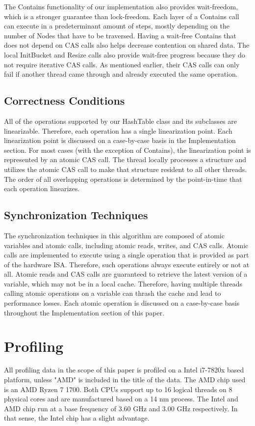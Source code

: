 \documentclass[11pt]{article} %
\begin{document}
The Contains functionality of our implementation also provides wait-freedom, which is a stronger guarantee than lock-freedom. Each layer of a Contains call can execute in a predeterminant amount of steps, mostly depending on the number of Nodes that have to be traversed. Having a wait-free Contains that does not depend on CAS calls also helps decrease contention on shared data. The local InitBucket and Resize calls also provide wait-free progress because they do not require iterative CAS calls. As mentioned earlier, their CAS calls can only fail if another thread came through and already executed the same operation.

\subsection{Correctness Conditions}

All of the operations supported by our HashTable class and its subclasses are linearizable. Therefore, each operation has a single linearization point. Each linearization point is discussed on a case-by-case basis in the Implementation section. For most cases (with the exception of Contains), the linearization point is represented by an atomic CAS call. The thread locally processes a structure and utilizes the atomic CAS call to make that structure resident to all other threads. The order of all overlapping operations is determined by the point-in-time that each operation linearizes. 

\subsection{Synchronization Techniques}

The synchronization techniques in this algorithm are composed of atomic variables and atomic calls, including atomic reads, writes, and CAS calls. Atomic calls are implemented to execute using a single operation that is provided as part of the hardware ISA. Therefore, such operations always execute entirely or not at all. Atomic reads and CAS calls are guaranteed to retrieve the latest version of a variable, which may not be in a local cache. Therefore, having multiple threads calling atomic operations on a variable can thrash the cache and lead to performance losses. Each atomic operation is discussed on a case-by-case basis throughout the Implementation section of this paper.

\section{Profiling}
All profiling data in the scope of this paper is profiled on a Intel i7-7820x based platform, unless "AMD" is included in the title of the data. The AMD chip used is an AMD Ryzen 7 1700. Both CPUs support up to 16 logical threads on 8 physical cores and are manufactured based on a 14 nm process. The Intel and AMD chip run at a base frequency of 3.60 GHz and 3.00 GHz respectively. In that sense, the Intel chip has a slight advantage.
\end{document}
